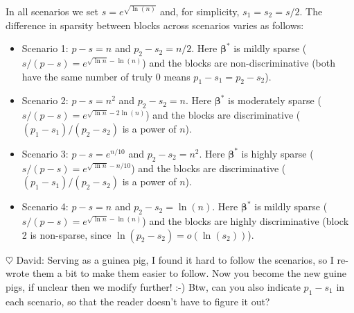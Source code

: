 \documentclass[aos]{imsart}
\theoremstyle{plain}
\newcommand{\david}[1]{{\small{\color{blue} \sf $\heartsuit$ David: #1}}}
\newcommand{\bs}{\boldsymbol}
\begin{document}
In all scenarios we set $s=e^{\sqrt{\ln(n)}}$ and, for simplicity, $s_1=s_2=s/2$. The difference in sparsity between blocks %
across scenarios varies as follows:
\begin{itemize}
    \item Scenario 1: $p-s=n$ and $p_2-s_2=n/2$. Here $\bs\beta^*$ is mildly sparse ($s/(p-s)= e^{\sqrt{\ln n} - \ln(n)}$) and the blocks are non-discriminative (both have the same number of truly 0 means $p_1-s_1=p_2-s_2$). %
    \item Scenario 2: $p-s=n^2$ and $p_2-s_2=n$. Here $\bs\beta^*$ is moderately sparse ($s/(p-s)= e^{\sqrt{\ln n} - 2\ln(n)}$) and the blocks are %
    discriminative ($(p_1-s_1)/(p_2-s_2)$ is a power of $n$). %
    \item Scenario 3: $p-s=e^{n/10}$ and $p_2-s_2=n^2$. Here $\bs\beta^*$ is highly sparse ($s/(p-s)= e^{\sqrt{\ln n} - n/10}$) and the blocks are %
    discriminative ($(p_1-s_1)/(p_2-s_2)$ is a power of $n$). %
    \item Scenario 4: $p-s=n$ and $p_2-s_2=\ln(n)$. Here $\bs\beta^*$ is mildly sparse ($s/(p-s)= e^{\sqrt{\ln n} - \ln(n)}$) and the blocks are %
    highly discriminative (block 2 is non-sparse, since $\ln(p_2-s_2)=o(\ln(s_2))$).
\end{itemize}

\david{Serving as a guinea pig, I found it hard to follow the scenarios, so I re-wrote them a bit to make them easier to follow. Now you become the new guine pigs, if unclear then we modify further! :-) Btw, can you also indicate $p_1-s_1$ in each scenario, so that the reader doesn't have to figure it out?}
\end{document}
